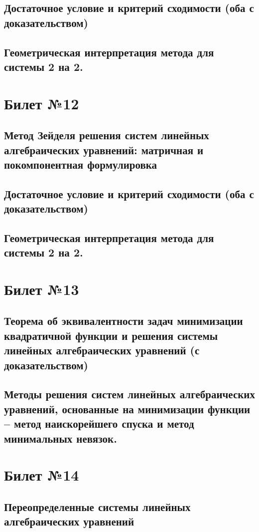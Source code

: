 \documentclass[a4paper]{article}
\begin{document}
\subsection{Достаточное условие и критерий сходимости (оба с доказательством)}
\subsection{Геометрическая интерпретация метода для системы 2 на 2.}

\section{Билет №12}
\subsection{Метод Зейделя решения систем линейных алгебраических уравнений: матричная и покомпонентная формулировка}
\subsection{Достаточное условие и критерий сходимости (оба с доказательством)}
\subsection{Геометрическая интерпретация метода для системы 2 на 2.}

\section{Билет №13}
\subsection{Теорема об эквивалентности задач минимизации квадратичной функции и решения системы линейных алгебраических уравнений (с доказательством)}
\subsection{Методы решения систем линейных алгебраических уравнений, основанные на минимизации функции – метод наискорейшего спуска и метод минимальных невязок.}

\section{Билет №14}
\subsection{Переопределенные системы линейных алгебраических уравнений}
\end{document}
